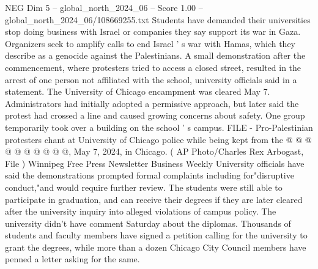 \begin{textsample}{NEG Dim 5 – global\_north\_2024\_06 – Score 1.00 – global\_north\_2024\_06/108669255.txt}
Students have demanded their universities stop doing business with Israel or companies they say support its war in Gaza.
Organizers seek to amplify calls to end Israel ' s war with Hamas, which they describe as a genocide against the Palestinians.
A small demonstration after the commencement, where protesters tried to access a closed street, resulted in the arrest of one person not affiliated with the school, university officials said in a statement.
The University of Chicago encampment was cleared May 7.
Administrators had initially adopted a permissive approach, but later said the protest had crossed a line and caused growing concerns about safety.
One group temporarily took over a building on the school ' s campus.
FILE - Pro-Palestinian protesters chant at University of Chicago police while being kept from the @ @ @ @ @ @ @ @ @ @, May 7, 2024, in Chicago. ( AP Photo/Charles Rex Arbogast, File ) Winnipeg Free Press Newsletter Business Weekly University officials have said the demonstrations prompted formal complaints including for"disruptive conduct,"and would require further review.
The students were still able to participate in graduation, and can receive their degrees if they are later cleared after the university inquiry into alleged violations of campus policy.
The university didn't have comment Saturday about the diplomas.
Thousands of students and faculty members have signed a petition calling for the university to grant the degrees, while more than a dozen Chicago City Council members have penned a letter asking for the same.

\end{textsample}
